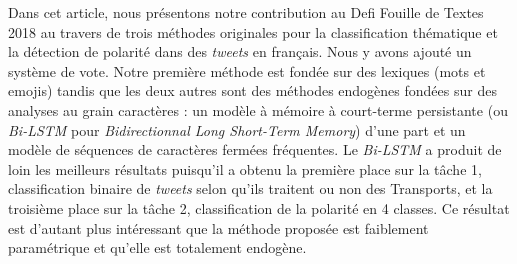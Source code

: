 
 Dans cet article, nous présentons notre contribution au Defi Fouille de Textes 2018 au travers de trois méthodes originales pour la classification thématique et la détection de polarité dans des \textit{tweets} en français. Nous y avons ajouté un système de vote.
 Notre première méthode est fondée sur des lexiques (mots et emojis) tandis que les deux autres sont des méthodes endogènes fondées sur des analyses au grain caractères : un modèle à mémoire à court-terme persistante (ou \textit{Bi-LSTM} pour \textit{Bidirectionnal Long Short-Term Memory}) d'une part et un modèle de séquences de caractères fermées fréquentes.
 Le \textit{Bi-LSTM} a produit de loin les meilleurs résultats puisqu'il a obtenu la première place sur la tâche 1, classification binaire de \textit{tweets} selon qu'ils traitent ou non des Transports, et la troisième place sur la tâche 2, classification de la polarité en 4 classes.
 Ce résultat est d'autant plus intéressant que la méthode proposée est faiblement paramétrique et qu'elle est totalement endogène. 
